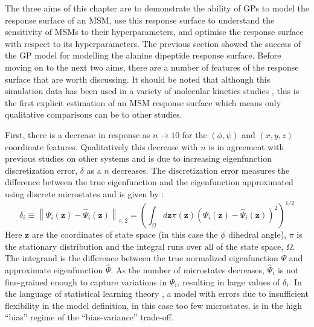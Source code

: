The three aims of this chapter are to demonstrate the ability of GPs to model the response surface of an MSM, use this response surface to understand the sensitivity of MSMs to their hyperparameters, and optimise the response surface with respect to its hyperparameters. The previous section showed the success of the GP model for modelling the alanine dipeptide response surface.  Before moving on to the next two aims, there are a number of features of the response surface that are worth discussing.  It should be noted that although this simulation data has been used in a variety of molecular kinetics studies \cite{wehmeyerTimelaggedAutoencodersDeep2018a, nuskeMarkovStateModels2017b, nuskeCoarsegrainingMolecularSystems2019, wangMachineLearningCoarseGrained2019, liNeuralCanonicalTransformation2020, varolgunesInterpretableEmbeddingsMolecular2020, nuskeSpectralPropertiesEffective2021, sechiEstimationKoopmanGenerator2021, mardtVAMPnetsDeepLearning2018}, this is the first explicit estimation of an MSM response surface which means only qualitative comparisons can be to other studies. 

First, there is a decrease in response as $n \rightarrow 10$ for the $(\phi, \psi)$ and $(x,y,z)$ coordinate features. Qualitatively this decrease with $n$ is in agreement with previous studies on other systems \cite{wuVariationalApproachLearning2020c,mcgibbonVariationalCrossvalidationSlow2015} and is due to increasing eigenfunction discretization error, $\delta$ \cite{prinzMarkovModelsMolecular2011} as a $n$ decreases. The discretization error measures the difference between the true eigenfunction and the eigenfunction approximated using discrete microstates and is given by \cite{prinzMarkovModelsMolecular2011}:
\begin{equation}\label{eqn:disc_error}
    \delta_{i} \equiv\left\|\Psi_{i}\left(\mathbf{z}\right)-\hat{\Psi}_{i}\left(\mathbf{z}\right)\right\|_{\pi, 2}=\left(\int_{\Omega} d \mathbf{z} \pi(\mathbf{z})(\Psi_{i}(\mathbf{z})-\hat{\Psi}_{i}(\mathbf{z}))^{2}\right)^{1 / 2}
\end{equation}
Here $\mathbf{z}$ are the coordinates of state space (in this case the $\phi$ dihedral angle), $\pi$ is the stationary distribution and the integral runs over all of the state space, $\Omega$. The integrand is the difference between the true normalized eigenfunction $\Psi$ and approximate eigenfunction $\hat{\Psi}$. As the number of microstates decreases, $\hat{\Psi}_{i}$ is not fine-grained enough to capture variations in $\Psi_{i}$, resulting in large values of $\delta_{i}$. In the language of statistical learning theory \cite{friedman2001elements}, a model with errors due to insufficient flexibility in the model definition, in this case too few microstates, is in the high ``bias'' regime of the ``bias-variance'' trade-off. 

